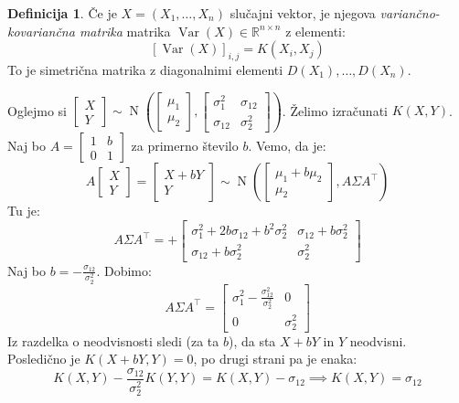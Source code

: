 \documentclass[12pt]{book}
\theoremstyle{definition}
\newtheorem{definicija}{Definicija}
\theoremstyle{plain}
\theoremstyle{plain}
\theoremstyle{plain}
\theoremstyle{remark}
\begin{document}
\begin{definicija}
    Če je $X=\left(X_1, \ldots, X_n\right)$ slučajni vektor, je njegova \emph{variančno-kovariančna matrika} matrika $\operatorname{Var}(X) \in \mathbb{R}^{n \times n}$ z elementi: 
    $$
    [\operatorname{Var}(X)]_{i, j}=K\left(X_i, X_j\right)
    $$
    To je simetrična matrika z diagonalnimi elementi $D\left(X_1\right), \ldots, D\left(X_n\right)$.
\end{definicija}

\begin{zgled}
    Oglejmo si $\begin{bmatrix}X \\ Y\end{bmatrix} \sim \operatorname{N}\left(\begin{bmatrix}\mu_1 \\ \mu_2 \end{bmatrix}, \begin{bmatrix}\sigma_1^2 & \sigma_{12} \\ \sigma_{12} & \sigma_2^2\end{bmatrix} \right)$. Želimo izračunati $K(X,Y)$. Naj bo $A = \begin{bmatrix}1 & b \\ 0 & 1\end{bmatrix}$ za primerno število $b$. Vemo, da je:
    $$A \begin{bmatrix}X \\ Y\end{bmatrix} = \begin{bmatrix}X +bY \\ Y\end{bmatrix} \sim \operatorname{N}\left( \begin{bmatrix}\mu_1 + b \mu_2 \\ \mu_2\end{bmatrix}, A \Sigma A^{\top}\right)$$ 
    Tu je: 
    $$
    A \Sigma A^{\top}=+\begin{bmatrix}
        \sigma_1^2+2 b \sigma_{12}+b^2 \sigma_2^2 & \sigma_{12}+b \sigma_2^2 \\
        \sigma_{12}+b \sigma_2^2 & \sigma_2^2
        \end{bmatrix}
    $$
    Naj bo $b=-\frac{\sigma_{12}}{\sigma_2^2}$. Dobimo: 
    $$
    A \Sigma A^{\top} = \begin{bmatrix}
        \sigma_1^2-\frac{\sigma_{12}^2}{\sigma_2^2} & 0 \\
        0 &  \sigma_2^2
        \end{bmatrix}
    $$
    Iz razdelka o neodvisnosti sledi (za ta $b$), da sta $X+bY$ in $Y$ neodvisni. Posledično je $K(X +bY, Y) = 0$, po drugi strani pa je enaka: 
    $$
    K(X, Y)-\frac{\sigma_{12}}{\sigma_2^2} K(Y, Y)=K(X, Y)-\sigma_{12} \implies K(X,Y) = \sigma_{12}
    $$
\end{zgled}
\end{document}

